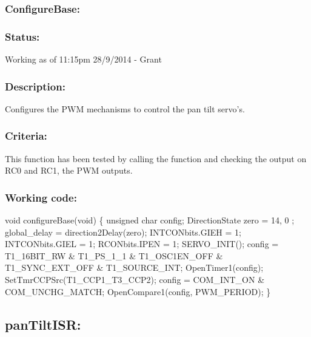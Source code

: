 \documentclass[]{article}
\begin{document}
\subsubsection{ConfigureBase:}
\subsubsection{Status:}
Working as of 11:15pm 28/9/2014 - Grant

\subsubsection{Description:}
Configures the PWM mechanisms to control the pan tilt servo's.

\subsubsection{Criteria:}
This function has been tested by calling the function and checking the output on RC0 and RC1, the PWM outputs.

\subsubsection{Working code:}
void configureBase(void) \newline
\{ \newline
unsigned char config; \newline
DirectionState zero = { 14, 0 }; \newline
global\_delay = direction2Delay(zero);\newline
INTCONbits.GIEH = 1;\newline
INTCONbits.GIEL = 1;\newline
RCONbits.IPEN = 1;\newline
SERVO\_INIT();\newline
config = T1\_16BIT\_RW \& T1\_PS\_1\_1 \& T1\_OSC1EN\_OFF \& T1\_SYNC\_EXT\_OFF \& T1\_SOURCE\_INT; \newline
OpenTimer1(config);\newline
SetTmrCCPSrc(T1\_CCP1\_T3\_CCP2);\newline
config = COM\_INT\_ON \& COM\_UNCHG\_MATCH;\newline
OpenCompare1(config, PWM\_PERIOD);\newline
\}

\subsection{panTiltISR:}
\end{document}
